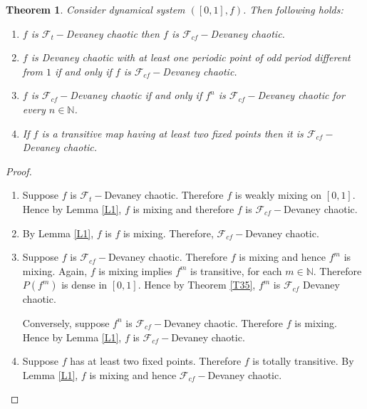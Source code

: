 \documentclass{amsart}[12pt, papera4]
\newtheorem{theorem}{Theorem}[section]
\theoremstyle{definition}
\theoremstyle{remark}
\numberwithin{equation}{section}
\def\N{{\mathbb N}}
\def\F{{\mathscr{F}}}
\begin{document}
\begin{theorem}
	Consider dynamical system $([0,1],f)$. Then following holds:
	\begin{enumerate}
		\item $f$ is $\F_t-$Devaney chaotic then $f$ is $\F_{cf}-$Devaney chaotic.
		\item $f$ is Devaney chaotic with at least one periodic point of odd period different from $1$ if and only if $f$ is $\F_{cf}-$Devaney chaotic.
		\item $f$ is $\F_{cf}-$Devaney chaotic if and only if $f^n$ is $\F_{cf}-$Devaney chaotic for every $n\in \N$.
		\item If $f$ is a transitive map having at least two fixed points then it is $\F_{cf}-$Devaney chaotic.
	\end{enumerate}
\end{theorem}
\begin{proof}
	\begin{enumerate}
		\item Suppose $f$ is $\F_t-$Devaney chaotic. Therefore $f$ is weakly mixing on $[0,1]$. Hence by Lemma \ref{L1}, $f$ is mixing and therefore $f$ is $\F_{cf}-$Devaney chaotic.
		\item By Lemma \ref{L1}, $f$ is $f$ is mixing. Therefore, $\F_{cf}-$Devaney chaotic. 
		\item Suppose $f$ is $\F_{cf}-$Devaney chaotic. Therefore $f$ is mixing and hence $f^m$ is mixing. Again, $f$ is mixing implies $f^m$ is transitive, for each $m\in \N$. Therefore $P(f^m)$ is dense in $[0,1]$. Hence by Theorem \ref{T35}, $f^m$ is $\F_{cf}$ Devaney chaotic.
		
		\noindent Conversely, suppose $f^n$ is $\F_{cf}-$Devaney chaotic. Therefore $f$ is mixing. Hence by Lemma \ref{L1}, $f$ is $\F_{cf}-$Devaney chaotic.
		
		\item Suppose $f$ has at least two fixed points. Therefore $f$ is totally transitive. By Lemma \ref{L1}, $f$ is mixing and hence $\F_{cf}-$Devaney chaotic.
	\end{enumerate}
\end{proof}
	
\end{document}
